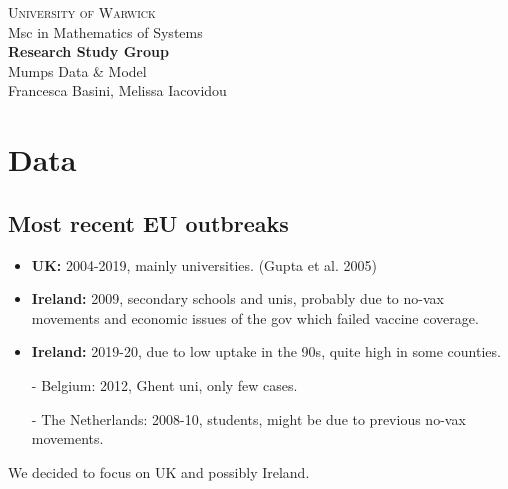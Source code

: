\documentclass[a4paper, 12pt]{article}
\begin{document}
\begin{center}
\large{\scshape University of Warwick}\\
{Msc in Mathematics of Systems}\\
	\vspace{0.75cm}
\textbf{Research Study Group}\\
	\Large{Mumps Data \& Model}\\
		\large{}
			\vspace{0.75cm}
			\normalsize{Francesca Basini, Melissa Iacovidou}
\end{center}


\section*{Data}
\subsection*{Most recent EU outbreaks}
\begin{itemize}
    \item \textbf{UK:} 2004-2019, mainly universities. (Gupta et al. 2005)
    \item \textbf{Ireland:} 2009, secondary schools and unis, probably due to no-vax movements and economic issues of the gov which failed vaccine coverage.
    \item \textbf{Ireland:} 2019-20, due to low uptake in the 90s, quite high in some counties.
    \item[-] Belgium: 2012, Ghent uni, only few cases.
    \item[-] The Netherlands: 2008-10, students, might be due to previous no-vax movements.
\end{itemize}


We decided to focus on UK and possibly Ireland.
\end{document}
